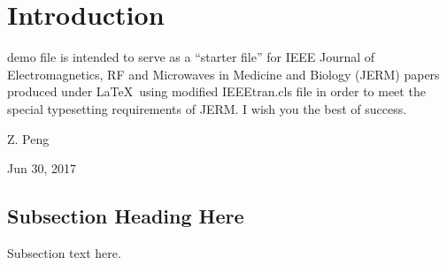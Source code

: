 \documentclass[journal,twocolumn,letterpaper]{IEEEJERM}
\begin{document}
%
\IEEEpeerreviewmaketitle


\section{Introduction}
% 
% 
% 
% 
 demo file is intended to serve as a ``starter file''
for IEEE Journal of Electromagnetics, RF and Microwaves in Medicine and Biology (JERM) papers produced under \LaTeX\ using modified IEEEtran.cls file in order to meet the special typesetting requirements of JERM.
I wish you the best of success.

\hfill Z. Peng
 
\hfill Jun 30, 2017

\subsection{Subsection Heading Here}
Subsection text here.

%
%
\end{document}

